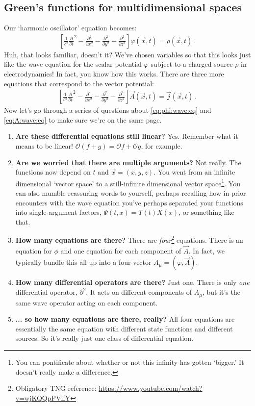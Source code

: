 \subsection{Green's functions for multidimensional spaces}
Our `harmonic oscillator' equation becomes:
\begin{align}
	\left[\frac{1}{c^2}
			\frac{\partial}{\partial t}^2
			-
			\frac{\partial^2}
			{\partial x^2}
			-
			\frac{\partial^2}
			{\partial y^2}
			-
			\frac{\partial^2}
			{\partial z^2}
		\right]
		\varphi(\vec{x},t) = \rho(\vec{x},t) \ .
		\label{eq:phi:wave:eq}
\end{align}
Huh, that looks familiar, doesn't it? We've chosen variables so that this looks just like the wave equation for the scalar potential $\varphi$ subject to a charged source $\rho$ in electrodynamics! In fact, you know how this works. There are three more equations that correspond to the vector potential:
\begin{align}
	\left[\frac{1}{c^2}
			\frac{\partial}{\partial t}^2
			-
			\frac{\partial^2}
			{\partial x^2}
			-
			\frac{\partial^2}
			{\partial y^2}
			-
			\frac{\partial^2}
			{\partial z^2}
		\right]
		\vec A(\vec{x},t) = \vec j(\vec{x},t) \ .
		\label{eq:A:wave:eq}
\end{align}
Now let's go through a series of questions about \eqref{eq:phi:wave:eq} and \eqref{eq:A:wave:eq} to make sure we're on the same page. 
\begin{enumerate}
\item \textbf{Are these differential equations still linear?} Yes. Remember what it means to be linear! $\mathcal O(f+g) = \mathcal Of +\mathcal Og$, for example.
\item \textbf{Are we worried that there are multiple arguments?} Not really. The functions now depend on $t$ and $\vec{x}=(x,y,z)$. You went from an infinite dimensional `vector space' to a still-infinite dimensional vector space\footnote{You can pontificate about whether or not this infinity has gotten `bigger.' It doesn't really make a difference.}. You can also mumble reassuring words to yourself, perhaps recalling how in prior encounters with the wave equation you've perhaps separated your functions into single-argument factors, $\Psi(t,x) = T(t)X(x)$, or something like that.
\item \textbf{How many equations are there?} There are \emph{four}\footnote{Obligatory TNG reference: \url{https://www.youtube.com/watch?v=wjKQQpPVifY}} equations. There is an equation for $\phi$ and one equation for each component of $\vec A$. In fact, we typically bundle this all up into a four-vector $A_\mu=(\varphi, \vec A)$. 
\item \textbf{How many differential operators are there?} Just one. There is only \emph{one} differential operator, $\partial^2$. It acts on different components of $A_\mu$, but it's the same wave operator acting on each component. 
\item \textbf{... so how many equations are there, really?} All four equations are essentially the same equation with different state functions and different sources. So it's really just one class of differential equation.
\end{enumerate}
